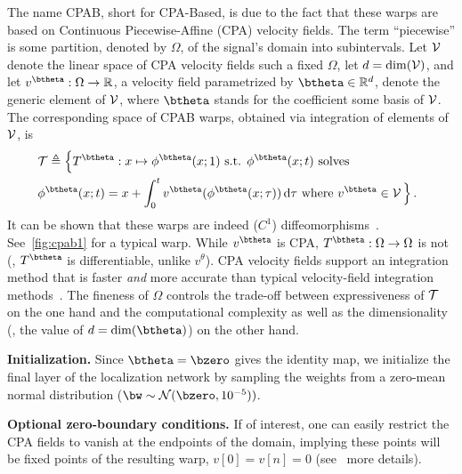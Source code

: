 The name CPAB, short for CPA-Based, is due to the fact that these warps 
are based on Continuous Piecewise-Affine (CPA) velocity fields. 
The term ``piecewise'' is \wrt some partition, denoted by $\Omega$, of the signal's domain into subintervals.
Let $\mathcal{V}$ denote the linear space of CPA velocity fields \wrt such a fixed $\Omega$,
let $d=\dim(\mathcal{V})$, and let $v^\btheta:\Omega\to\RR$, a velocity field parametrized
by $\btheta\in\Rd$, denote the generic element
of $\mathcal{V}$, where $\btheta$ stands for the coefficient \wrt some basis of $\mathcal{V}$.
%
The corresponding space of CPAB warps, obtained via integration of elements of $\mathcal{V}$,  is 
\begin{align}
\hspace{-2mm}&\Tcal\triangleq
   \Bigl \{
 T^\btheta:
   x\mapsto \phi^\btheta( x;1)
  \text{ s.t. } \phi^\btheta( x;t) \text{ solves } \nonumber \\ 
\hspace{-2mm} & \phi^\btheta(x;t) = x+\int_{0}^t  v^\btheta(\phi^\btheta(x;\tau))\, 
 \mathrm{d}\tau \text{ where }  v^\btheta\in \Vcal\, 
  \Bigr
 \}\, . \vspace{-5mm}
 \label{Eqn:IntegralEquation}
\end{align}
It can be shown that these warps are indeed ($C^1$) diffeomorphisms~\cite{Freifeld:ICCV:2015:CPAB,Freifeld:PAMI:2017:CPAB}.
See~\autoref{fig:cpab1}
 for a typical warp. While $v^\btheta$
is CPA, $T^\btheta:\Omega\to\Omega$ is not (\eg, $T^\btheta$ is differentiable, unlike $v^\theta$).
CPA velocity fields support an
integration method that is faster \emph{and} more accurate than typical 
velocity-field integration methods~\cite{Freifeld:ICCV:2015:CPAB,Freifeld:PAMI:2017:CPAB}.
The fineness of  $\Omega$ controls the trade-off between expressiveness of $\mathcal{T}$
on the one hand and the computational complexity as well as the dimensionality (\ie, the value of $d=\dim(\btheta)$) on the other 
hand. 
%
%
%

\textbf{Initialization.} Since $\btheta = \bzero$ gives the identity map,
we initialize the final layer of the localization network by sampling the weights from a zero-mean normal
distribution (\ie $\bw \sim \Ncal(\bzero, 10^{-5}))$. 

\textbf{Optional zero-boundary conditions.} If of interest, one can easily restrict 
the CPA fields to vanish at the endpoints of the domain, implying these points will be fixed points
of the resulting warp, \ie $v[0]=v[n]=0$ (see~\citet{Freifeld:PAMI:2017:CPAB} more details). 

